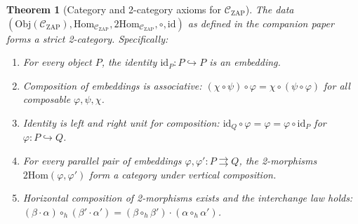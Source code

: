 \documentclass[11pt]{article}
\newtheorem{theorem}{Theorem}
\theoremstyle{definition}
\theoremstyle{remark}
\newcommand{\CZ}{\mathcal{C}_{\mathrm{ZAP}}}
\begin{document}
\begin{theorem}[Category and 2-category axioms for $\CZ$]
\label{thm:cat-axioms}
The data $(\mathrm{Obj}(\CZ), \mathrm{Hom}_{\CZ},
\mathrm{2Hom}_{\CZ}, \circ, \mathrm{id})$ as defined in the
companion paper forms a strict 2-category. Specifically:
\begin{enumerate}
\item For every object $P$, the identity $\mathrm{id}_P : P
\hookrightarrow P$ is an embedding.
\item Composition of embeddings is associative:
$(\chi \circ \psi) \circ \varphi = \chi \circ (\psi \circ \varphi)$
for all composable $\varphi, \psi, \chi$.
\item Identity is left and right unit for composition:
$\mathrm{id}_Q \circ \varphi = \varphi = \varphi \circ
\mathrm{id}_P$ for $\varphi : P \hookrightarrow Q$.
\item For every parallel pair of embeddings $\varphi, \varphi' : P
\rightrightarrows Q$, the 2-morphisms $\mathrm{2Hom}(\varphi,
\varphi')$ form a category under vertical composition.
\item Horizontal composition of 2-morphisms exists and the
interchange law holds:
$(\beta \cdot \alpha) \circ_h (\beta' \cdot \alpha') =
(\beta \circ_h \beta') \cdot (\alpha \circ_h \alpha')$.
\end{enumerate}
\end{theorem}
\end{document}
